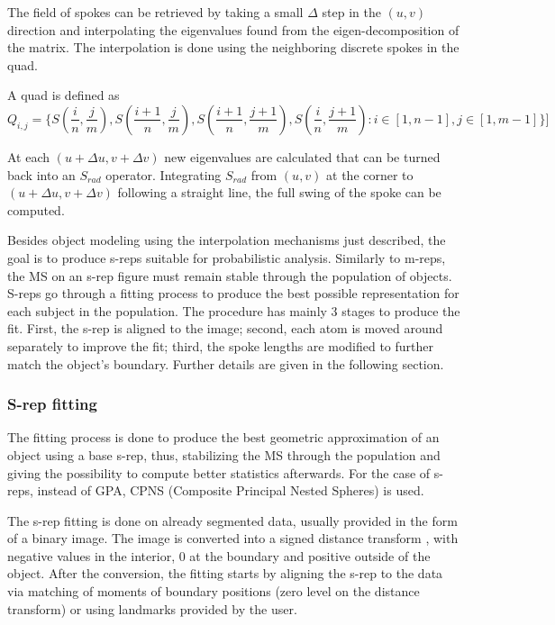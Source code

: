 The field of spokes can be retrieved by taking a small $\Delta$ step in the $(u, v)$ direction and interpolating  
the eigenvalues found from the eigen-decomposition of the matrix. 
The interpolation is done using the neighboring discrete spokes in the quad.

A quad is defined as
\begin{equation}
 Q_{i,j} = \{S(\frac{i}{n}, \frac{j}{m}), S(\frac{i+1}{n}, \frac{j}{m}), S(\frac{i+1}{n}, \frac{j+1}{m}), S(\frac{i}{n}, \frac{j+1}{m}) : i \in [1, n-1], j \in [1, m-1] \}]
 \label{equ:Quad}
\end{equation}
  
At each $(u + \Delta u, v + \Delta v)$ new eigenvalues 
are calculated that can be turned back into an $S_{rad}$ operator. Integrating $S_{rad}$
from $(u, v)$ at the corner to $(u + \Delta u, v + \Delta v)$ following a straight line, 
the full swing of the spoke can be computed. 

Besides object modeling using the interpolation mechanisms just described, 
the goal is to produce s-reps suitable for probabilistic analysis. 
Similarly to m-reps, the MS on an s-rep figure must remain 
stable through the population of objects.
S-reps go through a fitting process to produce the best possible
representation for each subject in the population. 
The procedure has mainly 3 stages to produce the fit. 
First, the s-rep is aligned to the image;
second, each atom is moved around separately to improve the fit; 
third, the spoke lengths are modified to further match the object's
boundary.
Further details are given in the following section.

\subsubsection{S-rep fitting}

The fitting process is done to produce the best 
geometric approximation of an object using 
a base s-rep, thus, stabilizing 
the MS through the population and giving the possibility to 
compute better statistics afterwards.
For the case of s-reps, instead of GPA, CPNS (Composite Principal Nested Spheres) is used.

The s-rep fitting is done on already segmented data, usually provided 
in the form of a binary image. The image is converted into 
a signed distance transform \cite{saboo2011aa}, with negative values 
in the interior, 0 at the boundary and positive outside of the object. 
After the conversion, 
the fitting starts by aligning the s-rep to the data
via matching of moments of boundary positions (zero level on the distance transform) or using 
landmarks provided by the user.


